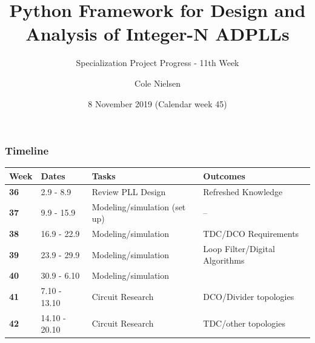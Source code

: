 \documentclass[t, screen, aspectratio=43]{beamer}
\title[Short title]{Python Framework for Design and Analysis of Integer-N ADPLLs}
\subtitle{Specialization Project Progress - 11th Week}
\author[C Nielsen]{Cole Nielsen}
\institute[NTNU]{Department of Electronic Systems, NTNU}
\date{8 November 2019 (Calendar week 45)}
\begin{document}
\begin{frame}
	\titlepage%
\end{frame}



\begin{frame}
	\frametitle{Timeline}
	\begin{table}[htb!]
		\tiny
		\centering
		\vspace{-1em}
		\def\arraystretch{1.5}		
		\setlength\arrayrulewidth{0.75pt}
		\setlength{\tabcolsep}{1em} %
		\begin{tabular}{|l|l|l|l|}
			\hline 
			\rule[-1ex]{0pt}{2.5ex} \cellcolor{gray!40}\textbf{Week} & \cellcolor{gray!40}\textbf{Dates} &\cellcolor{gray!40}\textbf{Tasks} & \cellcolor{gray!40}\textbf{Outcomes}\\ 
			\hline 
			\rule[-1ex]{0pt}{2.5ex} \cellcolor{red!20}\textbf{36}& \cellcolor{red!20}2.9 - 8.9 & \cellcolor{red!20}Review PLL Design & \cellcolor{red!20}Refreshed Knowledge\\ 
			\hline 
			\rule[-1ex]{0pt}{2.5ex} \cellcolor{red!20}\textbf{37}& \cellcolor{red!20}9.9 - 15.9 & \cellcolor{red!20}Modeling/simulation (set up) & \cellcolor{red!20}--\\ 
			\hline 
			\rule[-1ex]{0pt}{2.5ex} \cellcolor{red!20}\textbf{38}& \cellcolor{red!20}16.9 - 22.9 & \cellcolor{red!20}Modeling/simulation &\cellcolor{red!20}TDC/DCO Requirements\\ 
			\hline 
			\rule[-1ex]{0pt}{2.5ex} \cellcolor{red!20}\textbf{39}& \cellcolor{red!20}23.9 - 29.9& \cellcolor{red!20}Modeling/simulation& \cellcolor{red!20}Loop Filter/Digital Algorithms\\ 
			\hline 
			\rule[-1ex]{0pt}{2.5ex} \cellcolor{red!20}\textbf{40}& \cellcolor{red!20}30.9 - 6.10& \cellcolor{red!20}Modeling/simulation& \cellcolor{red!20}{Loop filter, DCO, TDC, calibration}\color{black}\\ 
			\hline 
			\rule[-1ex]{0pt}{2.5ex} \cellcolor{red!20}\textbf{41}&\cellcolor{red!20}7.10 - 13.10&\cellcolor{red!20}Circuit Research &\cellcolor{red!20}DCO/Divider topologies\\ 
			\hline 
			\rule[-1ex]{0pt}{2.5ex} \cellcolor{red!20}\textbf{42}&\cellcolor{red!20}14.10 - 20.10&\cellcolor{red!20}Circuit Research &\cellcolor{red!20}TDC/other topologies\\ 

\end{tabular}
\end{table}
\end{frame}
\end{document}
